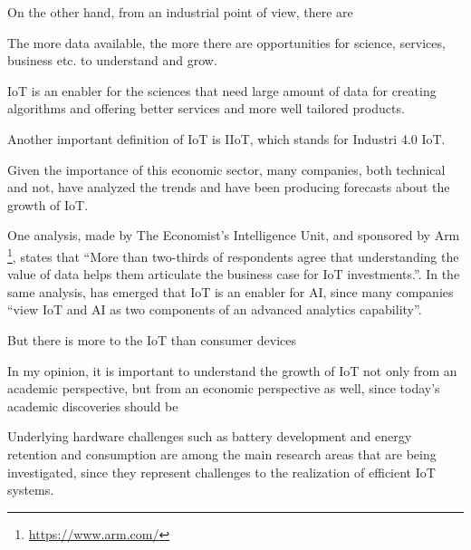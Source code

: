 		
		On the other hand, from an industrial point of view, there are 
		
		\vspace{3cm}
		
		
		The more data available, the more there are opportunities for science, services, business etc. to understand and grow.
		
		IoT is an enabler for the sciences that need large amount of data for creating algorithms and offering better services and more well tailored products.
		
		Another important definition of IoT is IIoT, which stands for Industri 4.0 IoT.
		
		Given the importance of this economic sector, many companies, both technical and not, have analyzed the trends and have been producing forecasts about the growth of IoT.
		
		One analysis, made by The Economist's Intelligence Unit, and sponsored by Arm \footnote{\url{https://www.arm.com/}}, states that ``More than two-thirds of respondents agree that understanding the value of data helps them articulate the business case for IoT investments.''\cite{economist-iot-business-index-2020-arm}.
		In the same analysis, has emerged that IoT is an enabler for AI, since many companies ``view IoT and AI as two components of an advanced analytics capability''.
		
		But there is more to the IoT than consumer devices
		
		In my opinion, it is important to understand the growth of IoT not only from an academic perspective, but from an economic perspective as well, since today's academic discoveries should be 
			
		Underlying hardware challenges such as battery development and energy retention and consumption are among the main research areas that are being investigated, since they represent challenges to the realization of efficient IoT systems.
		
